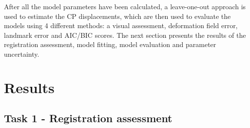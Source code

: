 \documentclass[11pt,a4paper,oneside]{report}
\begin{document}
After all the model parameters have been calculated, a leave-one-out approach is used to estimate the CP displacements, which are then used to evaluate the models using 4 different methods: a visual assessment, deformation field error, landmark error and AIC/BIC scores. The next section presents the results of the registration assessment, model fitting, model evaluation and parameter uncertainty.

\section*{Results}

\subsection*{Task 1 - Registration assessment}
\end{document}
